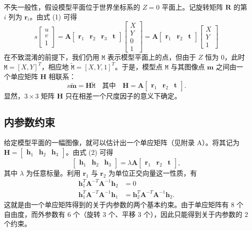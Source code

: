 \documentclass[a4paper,twocolumn,zihao=5,fontset=none,UTF8]{ctexart}
\newcommand{\A}{\mathbf{A}}
\newcommand{\Hm}{\mathbf{H}}
\newcommand{\R}{\mathbf{R}}
\newcommand{\h}{\mathbf{h}}
\newcommand{\rr}{\mathbf{r}}
\newcommand{\tv}{\mathbf{t}}
\newcommand{\m}{\mathbf{m}}
\newcommand{\tm}{\widetilde{\mathbf{m}}}
\newcommand{\M}{\mathtt{M}}
\newcommand{\tM}{\widetilde{\mathtt{M}}}
\begin{document}
不失一般性，假设模型平面位于世界坐标系的 $Z=0$ 平面上。记旋转矩阵 $\R$ 的第 $i$ 列为 $\rr_i$。由式 (1) 可得
\begin{equation*}
  s\begin{bmatrix}u\\ v\\ 1\end{bmatrix}
  =\A\begin{bmatrix}\rr_1 & \rr_2 & \rr_3 & \tv\end{bmatrix}
   \begin{bmatrix}X\\ Y\\ 0\\ 1\end{bmatrix}
  =\A\begin{bmatrix}\rr_1 & \rr_2 & \tv\end{bmatrix}
   \begin{bmatrix}X\\ Y\\ 1\end{bmatrix}
\end{equation*}
在不致混淆的前提下，我们仍用 $\M$ 表示模型平面上的点，但由于 $Z$ 恒为 0，此时 $\M=[X,Y]^T$，相应地 $\tM=[X,Y,1]^T$。于是，模型点 $\M$ 与其图像点 $\m$ 之间由一个单应矩阵 $\Hm$ 相联系：
\begin{equation}
  s\tm=\Hm\tM\quad\text{其中}\quad \Hm=\A\begin{bmatrix}\rr_1 & \rr_2 & \tv\end{bmatrix}.
\end{equation}
显然，$3\times3$ 矩阵 $\Hm$ 只在相差一个尺度因子的意义下确定。

\subsection{内参数约束}

给定模型平面的一幅图像，就可以估计出一个单应矩阵（见附录 A）。将其记为 $\Hm=\begin{bmatrix}\h_1 & \h_2 & \h_3\end{bmatrix}$。由式 (2) 可得
\begin{equation*}
  \begin{bmatrix}\h_1 & \h_2 & \h_3\end{bmatrix}
  =\lambda\A\begin{bmatrix}\rr_1 & \rr_2 & \tv\end{bmatrix},
\end{equation*}
其中 $\lambda$ 为任意标量。利用 $\rr_1$ 与 $\rr_2$ 为单位正交向量这一性质，有
\begin{align}
  \h_1^T\A^{-T}\A^{-1}\h_2 &= 0\\
  \h_1^T\A^{-T}\A^{-1}\h_1 &= \h_2^T\A^{-T}\A^{-1}\h_2 .
\end{align}
这就是由一个单应矩阵得到的关于内参数的两个基本约束。由于单应矩阵有 8 个自由度，而外参数有 6 个（旋转 3 个、平移 3 个），因此只能得到关于内参数的 2 个约束。
\end{document}
